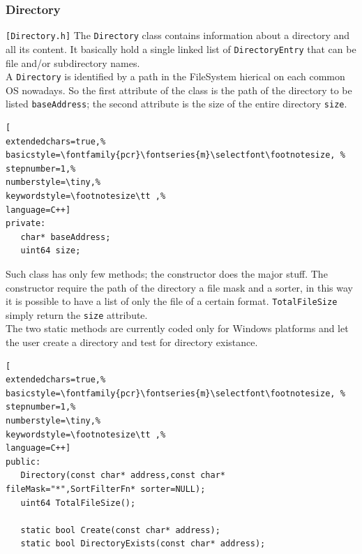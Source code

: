 \subsubsection{Directory}
\texttt{[Directory.h]}
The \texttt{Directory} class contains information about a directory and all its content. It basically hold a single linked list of \texttt{DirectoryEntry} that can be file and/or subdirectory names. \\


A \texttt{Directory} is identified by a path in the FileSystem hierical on each common OS nowadays. So the first attribute of the class is the path of the directory to be listed \texttt{baseAddress}; the second attribute is the size of the entire directory \texttt{size}.

\begin{lstlisting}[
extendedchars=true,%
basicstyle=\fontfamily{pcr}\fontseries{m}\selectfont\footnotesize, %
stepnumber=1,%
numberstyle=\tiny,%
keywordstyle=\footnotesize\tt ,%
language=C++]
private:
   char* baseAddress;
   uint64 size;
\end{lstlisting}

Such class has only few methods; the constructor does the major stuff. The constructor require the path of the directory a file mask and a sorter, in this way it is possible to have a list of only the file of a certain format.
\texttt{TotalFileSize} simply return the \texttt{size} attribute.\\


The two static methods are currently coded only for Windows platforms and let the user create a directory and test for directory existance.

\begin{lstlisting}[
extendedchars=true,%
basicstyle=\fontfamily{pcr}\fontseries{m}\selectfont\footnotesize, %
stepnumber=1,%
numberstyle=\tiny,%
keywordstyle=\footnotesize\tt ,%
language=C++]
public:
   Directory(const char* address,const char* fileMask="*",SortFilterFn* sorter=NULL);
   uint64 TotalFileSize();

   static bool Create(const char* address);
   static bool DirectoryExists(const char* address);
\end{lstlisting}



